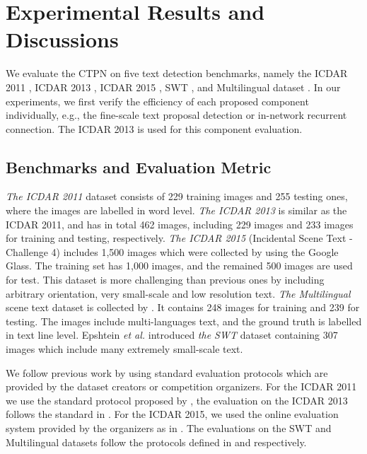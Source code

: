 \documentclass[runningheads]{llncs}
\begin{document}
\section{Experimental Results and Discussions}
We evaluate the  CTPN on five text detection benchmarks, namely the ICDAR 2011 \cite{Minetto2010}, ICDAR 2013 \cite{Karatzas2013}, ICDAR 2015 \cite{Karatzas2015}, SWT \cite{Epshtein2010}, and Multilingual dataset \cite{Pan2011}. In our experiments, we first verify the efficiency of each proposed component individually, e.g., the fine-scale text proposal detection or  in-network recurrent connection. The ICDAR 2013 is used for this component evaluation.

\subsection{Benchmarks and Evaluation Metric} 
\textit{The ICDAR 2011} dataset \cite{Minetto2010} consists of 229 training images and 255 testing ones, where the images are labelled in word level. \textit{The ICDAR 2013 }\cite{Karatzas2013} is similar as the ICDAR 2011, and has in total 462 images, including 229 images and 233 images for training and testing, respectively.  \textit{The ICDAR 2015} (Incidental Scene Text - Challenge 4) \cite{Karatzas2015} includes 1,500 images which were collected by using the Google Glass. The training set has 1,000 images, and the remained 500 images are used for test. This dataset is more challenging than previous ones by including arbitrary orientation, very small-scale and low resolution text. \textit{The Multilingual} scene text dataset is collected by \cite{Pan2011}. It contains 248 images for training and 239 for testing. The images include multi-languages text, and the ground truth is labelled in text line level. Epshtein \textit{et al.} \cite{Epshtein2010} introduced \textit{the SWT} dataset containing 307 images which include many extremely small-scale text.

We follow previous work by using standard evaluation protocols which are provided by the dataset creators or competition organizers. For the ICDAR 2011 we use the standard protocol proposed by \cite{Wolf2006},  the evaluation on the ICDAR 2013 follows the standard in \cite{Karatzas2013}. For the ICDAR 2015, we used the online evaluation system provided by the organizers as in \cite{Karatzas2015}. The evaluations on the SWT and Multilingual datasets follow the  protocols defined in \cite{Epshtein2010} and  \cite{Pan2011} respectively.  
\end{document}
